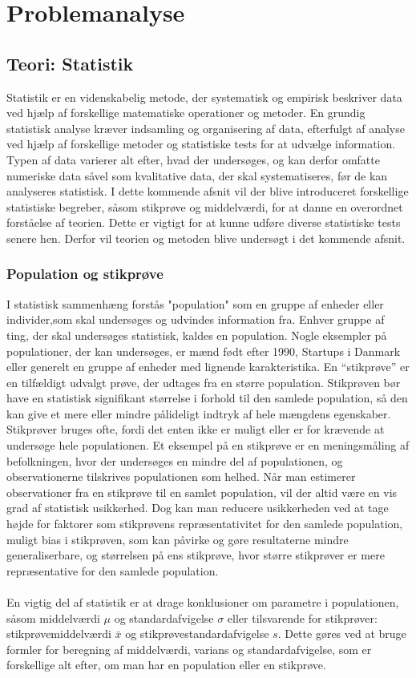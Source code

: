 \chapter{Problemanalyse}\label{ch:teori}
\section{Teori: Statistik}
Statistik er en videnskabelig metode, der systematisk og empirisk beskriver data ved hjælp af forskellige matematiske operationer og metoder. En grundig statistisk analyse kræver indsamling og organisering af data, efterfulgt af analyse ved hjælp af forskellige metoder og statistiske tests for at udvælge information. Typen af data varierer alt efter, hvad der undersøges, og kan derfor omfatte numeriske data såvel som kvalitative data, der skal systematiseres, før de kan analyseres statistisk. 
I dette kommende afsnit vil der blive introduceret forskellige statistiske begreber, såsom stikprøve og middelværdi, for at danne en overordnet forståelse af teorien. Dette er vigtigt for at kunne udføre diverse statistiske tests senere hen. Derfor vil teorien og metoden blive undersøgt i det kommende afsnit.

\subsection{Population og stikprøve}
I statistisk sammenhæng forstås "population" som en gruppe af enheder eller individer,som skal undersøges og udvindes information fra. Enhver gruppe af ting, der skal undersøges statistisk, kaldes en population. Nogle eksempler på populationer, der kan undersøges, er mænd født efter 1990, Startups i Danmark eller generelt en gruppe af enheder med lignende karakteristika.
En “stikprøve” er en tilfældigt udvalgt prøve, der udtages fra en større population. Stikprøven bør have en statistisk signifikant størrelse i forhold til den samlede population, så den kan give et mere eller mindre pålideligt indtryk af hele mængdens egenskaber. Stikprøver bruges ofte, fordi det enten ikke er muligt eller er for krævende at undersøge hele populationen. Et eksempel på en stikprøve er en meningsmåling af befolkningen, hvor der undersøges en mindre del af populationen, og observationerne tilskrives populationen som helhed.
Når man estimerer observationer fra en stikprøve til en samlet population, vil der altid være en vis grad af statistisk usikkerhed. Dog kan man reducere usikkerheden ved at tage højde for faktorer som stikprøvens repræsentativitet for den samlede population, muligt bias i stikprøven, som kan påvirke og gøre resultaterne mindre generaliserbare, og størrelsen på ens stikprøve, hvor større stikprøver er mere repræsentative for den samlede population.
\\
\\
En vigtig del af statistik er at drage konklusioner om parametre i populationen, såsom middelværdi $\mu$ og standardafvigelse $\sigma$ eller tilsvarende for stikprøver: stikprøvemiddelværdi $\bar{x}$ og stikprøvestandardafvigelse $s$. Dette gøres ved at bruge formler for beregning af middelværdi, varians og standardafvigelse, som er forskellige alt efter, om man har en population eller en stikprøve.
